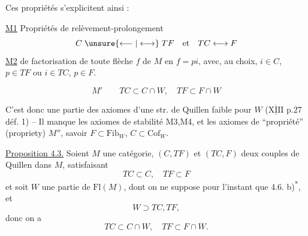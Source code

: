 Ces propriétés s'explicitent ainsi :

\uline{M1} Propriétés de relèvement-prolongement
\[
C\mathrel{\unsure{\longleftarrow|\longleftrightarrow}}TF\quad\text{et}\quad TC\longleftrightarrow F
\]
\uline{M2}  de factorisation de toute flèche $f$ de $M$ en $f=pi$, avec, au choix, $i\in C$, $p\in TF$ ou $i\in TC$, $p\in F$.

\[
M'\qquad TC\subset C\cap W,\quad TF\subset F\cap W
\]

C'est donc une partie des axiomes d'une str. de Quillen faible  pour $W$ ($\overline{\underline{\mathrm{XIII}}}$ p.27 déf. 1) -- Il manque les axiomes de stabilité M3,M4, et les axiomes de ``propriété'' (propriety) $M''$, savoir $F\subset\mathrm{Fib}_W$, $C\subset\mathrm{Cof}_W$.

\uline{Proposition 4.3.} Soient $M$ une catégorie, $(C,TF)$ et $(TC,F)$ deux couples de Quillen dans $M$, satisfaisant
\[
TC\subset C,\quad TF\subset F
\tag*{(4.3.1.)}
\]
et soit $W$ une partie de $\mathrm{Fl}(M)$, dont on ne suppose pour l'instant que 4.6. b)\textsuperscript{*}, et
\[
W\supset TC,TF,
\tag*{(4.3.2)}
\]
donc  on a
\[
TC\subset C\cap W,\quad TF\subset F\cap W.
\tag*{(4.3.3)}
\]

